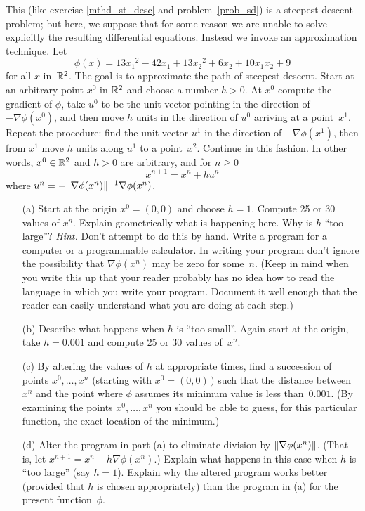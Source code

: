 \begin{prob}  This (like exercise \ref{mthd_st_desc} and problem~\ref{prob_sd}) is a steepest
descent problem; but here, we suppose that for some reason we are unable to solve explicitly
the resulting differential equations.  Instead we invoke an approximation technique.  Let
  \[ \phi(x) = 13{x_1}^2 - 42x_1 + 13{x_2}^2 + 6x_2 + 10x_1x_2 + 9 \]
for all $x$ in~$\mathbb{R}^2$.  The goal is to approximate the path of steepest descent.  Start at an
arbitrary point $x^0$ in $\mathbb{R}^2$ and choose a number $h > 0$.  At $x^0$ compute the gradient of
$\phi$, take $u^0$ to be the unit vector pointing in the direction of $-\nabla\phi(x^0)$, and
then move $h$ units in the direction of $u^0$ arriving at a point~$x^1$.  Repeat the
procedure: find the unit vector $u^1$ in the direction of $-\nabla\phi(x^1)$, then from $x^1$
move $h$ units along $u^1$ to a point~$x^2$.  Continue in this fashion.  In other words, $x^0
\in \mathbb{R}^2$ and $h > 0$ are arbitrary, and for $n \ge 0$
  \[ x^{n+1} = x^n + hu^n \]
where $u^n = -\lVert\nabla\phi(x^n)\rVert^{-1}\nabla\phi(x^n)$.
 \begin{enumerate}
  \item[(a)] Start at the origin $x^0 = (0,0)$ and choose $h = 1$. Compute 25 or 30 values of
$x^n$.  Explain geometrically what is happening here.  Why is $h$ ``too large''?  \emph{Hint.}
Don't attempt to do this by hand.  Write a program for a computer or a programmable
calculator. In writing your program don't ignore the possibility that $\nabla\phi(x^n)$  may
be zero for some~$n$. (Keep in mind when you write this up that your reader probably has no
idea how to read the language in which you write your program. Document it well enough that
the reader can easily understand what you are doing at each step.)
  \item[(b)] Describe what happens when $h$ is ``too small''.  Again start at the origin, take
$h = 0.001$ and compute 25 or 30 values of~$x^n$.
  \item[(c)] By altering the values of $h$ at appropriate times, find a succession of points $x^0,
\dots, x^n$ (starting with $x^0 = (0,0)\,)$ such that the distance between $x^n$ and the point
where $\phi$ assumes its minimum value is less than~$0.001$.  (By examining the points $x^0,
\dots, x^n$ you should be able to guess, for this particular function, the exact location of
the minimum.)
  \item[(d)] Alter the program in part (a) to eliminate division by $\lVert\nabla\phi(x^n)\rVert$.
(That is, let $x^{n+1} = x^n - h\nabla\phi(x^n)$.)  Explain what happens in this case when $h$
is ``too large'' (say $h = 1$).  Explain why the altered program works better (provided that
$h$ is chosen appropriately) than the program in (a) for the present function~$\phi$.
 \end{enumerate}
\end{prob}

